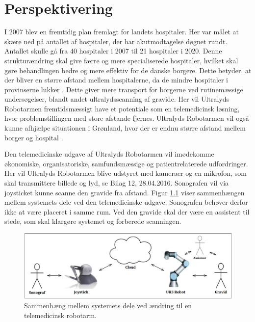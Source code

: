 \chapter{Perspektivering}
I 2007 blev en fremtidig plan fremlagt for landets hospitaler. Her var målet at skære ned på antallet af hospitaler, der har akutmodtagelse døgnet rundt. Antallet skulle gå fra 40 hospitaler i 2007 til 21 hospitaler i 2020. Denne strukturændring skal give færre og mere specialiserede hospitaler, hvilket skal gøre behandlingen bedre og mere effektiv for de danske borgere. Dette betyder, at der bliver en større afstand mellem hospitalerne, da de mindre hospitaler i provinserne lukker \cite{supersygehus}. Dette giver mere transport for borgerne ved rutinemæssige undersøgelser, blandt andet ultralydsscanning af gravide. Her vil Ultralyds Robotarmen fremtidsmæssigt have et potentiale som en telemedicinsk løsning, hvor problemstillingen med store afstande fjernes. Ultralyds Robotarmen vil også kunne afhjælpe situationen i Grønland, hvor der er endnu større afstand mellem borger og hospital \cite{greenland}.

Den telemedicinske udgave af Ultralyds Robotarmen vil imødekomme økonomiske, organisatoriske, samfundsmæssige og patientrelaterede udfordringer. Her vil Ultralyds Robotarmen blive udstyret med kameraer og en mikrofon, som skal transmittere billede og lyd, se Bilag 12, 28.04.2016. Sonografen vil via joysticket kunne scanne den gravide fra afstand. Figur \ref{systemTelemedicin} viser sammenhængen mellem systemets dele ved den telemedicinske udgave. Sonografen behøver derfor ikke at være placeret i samme rum. Ved den gravide skal der være en assistent til stede, som skal klargøre systemet og forberede scanningen.

\begin{figure}[H]\centering
	\includegraphics[width = 1.0\textwidth]{Figurer/teknologiTelemedicin.jpg}
	\caption{Sammenhæng mellem systemets dele ved ændring til en telemedicinsk robotarm.}
	\label{systemTelemedicin}
\end{figure}


